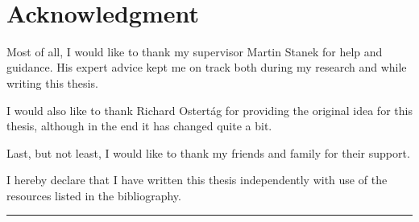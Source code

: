 ~\vspace{3cm}
\section*{Acknowledgment}

Most of all, I would like to thank my supervisor Martin Stanek for help and guidance.
His expert advice kept me on track both during my research and while writing this thesis.

I would also like to thank Richard Ostert\'ag for providing the original idea for this thesis, although in the end it has changed quite a bit.

Last, but not least, I would like to thank my friends and family for their support.

\vfill

\noindent I hereby declare that I have written this thesis independently with use of the resources listed in the bibliography. 

\vspace{1cm}

\hfill
\begin{minipage}{6cm}
\hrule\medskip \centering \small \textit{\settingsAuthor}
\end{minipage}

\vspace{3cm}